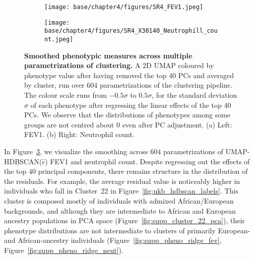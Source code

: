 \begin{figure}[h]
  \centering
  \begin{subfigure}[b]{0.45\linewidth}
    \texttt{[image: base/chapter4/figures/SR4\_FEV1.jpeg]}
    \caption{}
    \label{fig:smoothed_fev1}
  \end{subfigure}
    \begin{subfigure}[b]{0.45\linewidth}
    \texttt{[image: base/chapter4/figures/SR4\_X30140\_Neutrophill\_count.jpeg]}
    \caption{}
      \label{fig:smoothed_neutrophil}
  \end{subfigure}
  \caption[Smoothed phenotypic measures across multiple parametrizations of clustering]{\textbf{Smoothed phenotypic measures across multiple parametrizations of clustering.} A 2D UMAP coloured by phenotype value after having removed the top $40$ PCs and averaged by cluster, run over $604$ parametrizations of the clustering pipeline. The colour scale runs from $-0.5\sigma$ to $0.5\sigma$, for the standard deviation $\sigma$ of each phenotype after regressing the linear effects of the top $40$ PCs. We observe that the distributions of phenotypes among some groups are not centred about $0$ even after PC adjustment. (a) Left: FEV1. (b) Right:  Neutrophil count.}
\label{fig:smoothed_phenos}
\end{figure}

In Figure~\ref{fig:smoothed_phenos}, we visualize the smoothing across $604$ parametrizations of UMAP-HDBSCAN($\hat{\epsilon}$) FEV1 and neutrophil count. Despite regressing out the effects of the top $40$ principal components, there remains structure in the distribution of the residuals. For example, the average residual value is noticeably higher in individuals who fall in Cluster~22 in Figure~\ref{fig:ukb_hdbscan_labels}. This cluster is composed mostly of individuals with admixed African/European backgrounds, and although they are intermediate to African and European ancestry populations in PCA space (Figure~\ref{fig:supp_cluster_22_pca}), their phenotype distributions are not intermediate to clusters of primarily European- and African-ancestry individuals (Figure~\ref{fig:supp_pheno_ridge_fev}, Figure~\ref{fig:supp_pheno_ridge_neut}).

